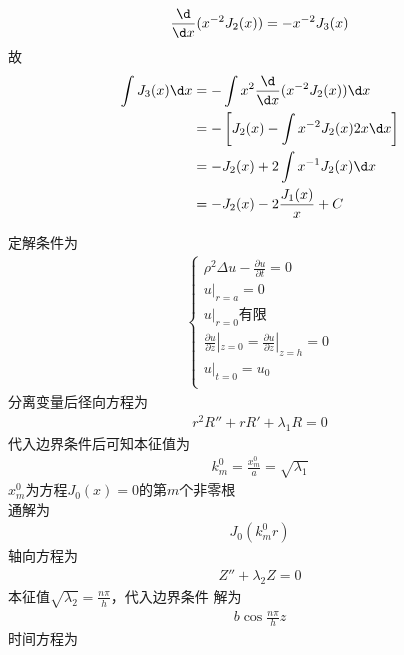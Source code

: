 \documentclass{phyasgn}
\begin{document}
\begin{sol}[1]
    \begin{align*}
        \frac{\d}{\d x}(x^{-2}J_2(x))=-x^{-2}J_3(x)
    \end{align*}
    故
    \begin{align*}
        \int J_3(x)\d x&=-\int x^2 \frac{\d}{\d x}(x^{-2}J_2(x))\d x\\
        &=-\left[J_2(x)-\int x^{-2}J_2(x)2x\d x\right]\\
        &=-J_2(x)+2\int x^{-1}J_2(x)\d x\\
        &=-J_2(x)-2\frac{J_1(x)}{x}+C
    \end{align*}
\end{sol}\par

\begin{sol}[2]
    定解条件为
    \begin{align*}
        \left\{
        \begin{matrix}
            \rho^2\Delta u-\frac{\partial u}{\partial t}=0\\
            u|_{r=a}=0\\
            u|_{r=0}\text{有限}\\
            \frac{\partial u}{\partial z}|_{z=0}=\frac{\partial u}{\partial z}|_{z=h}=0\\
            u|_{t=0}=u_0\\
        \end{matrix}
        \right.
    \end{align*}
    分离变量后径向方程为
    \begin{align*}
        r^2R''+rR'+\lambda_1R=0
    \end{align*}
    代入边界条件后可知本征值为
    \begin{align*}
        k_m^0=\frac{x_m^0}{a}=\sqrt{\lambda_1}
    \end{align*}
    $x_m^0$为方程$J_0(x)=0$的第$m$个非零根\\
    通解为
    \begin{align*}
        J_0(k_m^0r)
    \end{align*}
    轴向方程为
    \begin{align*}
        Z''+\lambda_2Z=0
    \end{align*}
    本征值$\sqrt{\lambda_2}=\frac{n\pi}{h}$，代入边界条件
    解为\begin{align*}
        b\cos\frac{n\pi}{h}z
    \end{align*}
    时间方程为
    \begin{align*}

\end{align*}
\end{sol}
\end{document}
